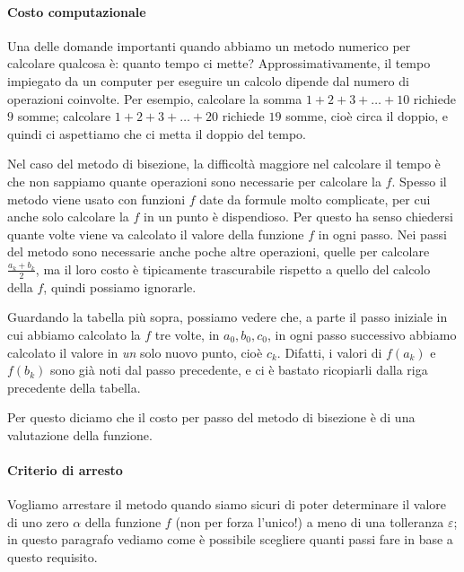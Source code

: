 \documentclass[a4paper]{report}
\theoremstyle{definiton}
\theoremstyle{remark}
\begin{document}
\paragraph{Costo computazionale} Una delle domande importanti quando abbiamo un metodo numerico per calcolare qualcosa è: quanto tempo ci mette? Approssimativamente, il tempo impiegato da un computer per eseguire un calcolo dipende dal numero di operazioni coinvolte. Per esempio, calcolare la somma $1+2+3+\dots+10$ richiede $9$ somme; calcolare $1+2+3+\dots+20$ richiede $19$ somme, cioè circa il doppio, e quindi ci aspettiamo che ci metta il doppio del tempo.

Nel caso del metodo di bisezione, la difficoltà maggiore nel calcolare il tempo è che non sappiamo quante operazioni sono necessarie per calcolare la $f$. Spesso il metodo viene usato con funzioni $f$ date da formule molto complicate, per cui anche solo calcolare la $f$ in un punto è dispendioso. Per questo ha senso chiedersi quante volte viene va calcolato il valore della funzione $f$ in ogni passo. Nei passi del metodo sono necessarie anche poche altre operazioni, quelle per calcolare $\frac{a_k+b_k}{2}$, ma il loro costo è tipicamente trascurabile rispetto a quello del calcolo della $f$, quindi possiamo ignorarle.

Guardando la tabella più sopra, possiamo vedere che, a parte il passo iniziale in cui abbiamo calcolato la $f$ tre volte, in $a_0,b_0,c_0$, in ogni passo successivo abbiamo calcolato il valore in \emph{un} solo nuovo punto, cioè $c_k$. Difatti, i valori di $f(a_k)$ e $f(b_k)$ sono già noti dal passo precedente, e ci è bastato ricopiarli dalla riga precedente della tabella.

Per questo diciamo che il costo per passo del metodo di bisezione è di una valutazione della funzione.

\paragraph{Criterio di arresto}
Vogliamo arrestare il metodo quando siamo sicuri di poter determinare il valore di uno zero $\alpha$ della funzione $f$ (non per forza l'unico!) a meno di una tolleranza $\varepsilon$; in questo paragrafo vediamo come è possibile scegliere quanti passi fare in base a questo requisito.
\end{document}
